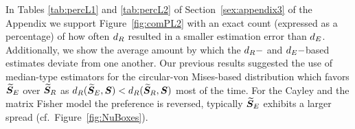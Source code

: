 In Tables \ref{tab:percL1} and \ref{tab:percL2} of Section~\ref{sex:appendix3} of the Appendix we support Figure~\ref{fig:comPL2} with an exact count (expressed as a percentage) of how often ${d_R}$ resulted in a smaller estimation error than ${d_E}$.  Additionally, we show the average amount by which the ${d_R}-$ and ${d_E}-$based estimates deviate from one another.  %
Our previous results suggested the use of median-type estimators for the circular-von Mises-based distribution which favors ${\widetilde{\bm S}_E}$ over ${\widetilde{\bm S}_R}$ as ${d_R}({\widetilde{\bm S}_E},\bm S) < {d_R}({\widetilde{\bm S}_R},\bm S)$ most of the time.  For the Cayley and the matrix Fisher model the preference is reversed, typically  ${\widetilde{\bm S}_E}$ exhibits a larger spread (cf.~Figure~\ref{fig:NuBoxes}). 


